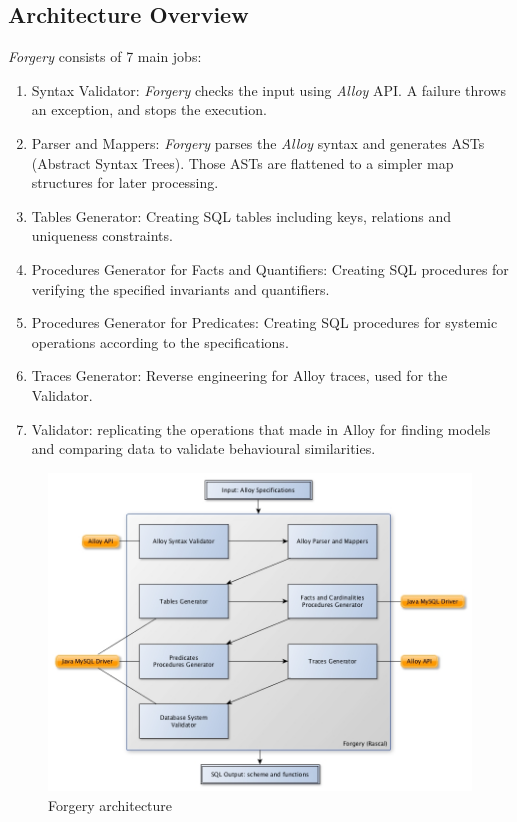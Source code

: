 \documentclass[oneside]{book}
\begin{document}
\subsection{Architecture Overview}
\textit{Forgery} consists of 7 main jobs:
\begin{enumerate}
	\item Syntax Validator: \textit{Forgery} checks the input using \textit{Alloy} API. A failure throws an exception, and stops the execution.
	\item Parser and Mappers: \textit{Forgery} parses the \textit{Alloy} syntax and generates ASTs (Abstract Syntax Trees). Those ASTs are flattened to a simpler map structures for later processing.
	\item Tables Generator: Creating SQL tables including keys, relations and uniqueness constraints.
	\item Procedures Generator for Facts and Quantifiers: Creating SQL procedures for verifying the specified invariants and quantifiers. 
	\item Procedures Generator for Predicates: Creating SQL procedures for systemic operations according to the specifications.
	\item Traces Generator: Reverse engineering for Alloy traces, used for the Validator.
	\item Validator: replicating the operations that made in Alloy for finding models and comparing data to validate behavioural similarities.
\end{enumerate}

\begin{figure}[h!]
\centering
\includegraphics[scale=0.5]{forgery}
\caption{Forgery architecture}
\end{figure}
\end{document}
